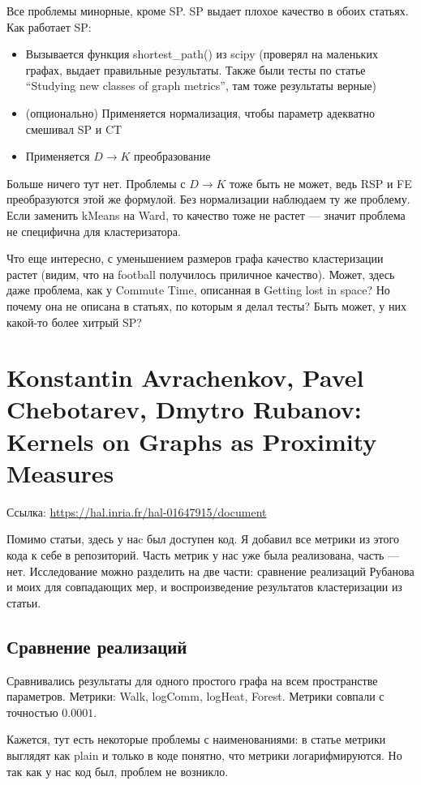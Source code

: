 \documentclass{article}
\begin{document}
Все проблемы минорные, кроме SP. SP выдает плохое качество в обоих статьях.
Как работает SP:
\begin{itemize}
  \item Вызывается функция shortest\_path() из scipy (проверял на маленьких графах, выдает правильные результаты. Также были тесты по статье ``Studying new classes of graph metrics'', там тоже результаты верные)
  \item (опционально) Применяется нормализация, чтобы параметр адекватно смешивал SP и CT
  \item Применяется $D \rightarrow K$ преобразование
\end{itemize}

Больше ничего тут нет. Проблемы с $D \rightarrow K$ тоже быть не может, ведь RSP и FE преобразуются этой же формулой. Без нормализации наблюдаем ту же проблему. Если заменить kMeans на Ward, то качество тоже не растет --- значит проблема не специфична для кластеризатора.

 Что еще интересно, с уменьшением размеров графа качество кластеризации растет (видим, что на football получилось приличное качество). Может, здесь даже проблема, как у Commute Time, описанная в Getting lost in space? Но почему она не описана в статьях, по которым я делал тесты? Быть может, у них какой-то более хитрый SP?


\section{Konstantin Avrachenkov, Pavel Chebotarev, Dmytro Rubanov:\\
         Kernels on Graphs as Proximity Measures}
Ссылка: \url{https://hal.inria.fr/hal-01647915/document}

Помимо статьи, здесь у наc был доступен код. Я добавил все метрики из этого кода к себе в репозиторий. Часть метрик у нас уже была реализована, часть --- нет.
Исследование можно разделить на две части: сравнение реализаций Рубанова и моих для совпадающих мер, и воспроизведение результатов кластеризации из статьи.

\subsection{Сравнение реализаций}
Сравнивались результаты для одного простого графа на всем пространстве параметров. Метрики: Walk, logComm, logHeat, Forest. Метрики совпали с точностью  $0.0001$.

Кажется, тут есть некоторые проблемы с наименованиями: в статье метрики выглядят как plain и только в коде понятно, что метрики логарифмируются. Но так как у нас код был, проблем не возникло.
\end{document}
